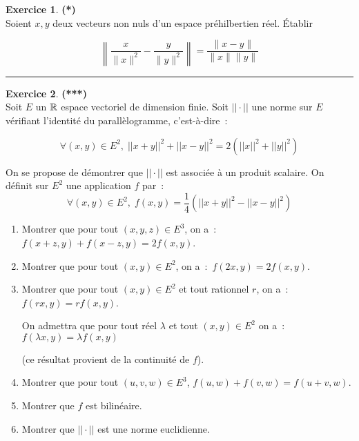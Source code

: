 \documentclass[a4paper,11pt]{article}
\theoremstyle{definition}
\newtheorem{exo}{Exercice} %
\begin{document}
\begin{minipage}{1\linewidth}
\begin{minipage}[t]{0.48\linewidth}
\begin{exo}\textbf{(*)}\quad\\[0.2cm]	
Soient $x, y$ deux vecteurs non nuls d'un espace préhilbertien réel. Établir

$$
\left\|\frac{x}{\|x\|^{2}}-\frac{y}{\|y\|^{2}}\right\|=\frac{\|x-y\|}{\|x\|\|y\|}
$$

\centering\rule{1\linewidth}{0.6pt}\end{exo}





\end{minipage}\end{minipage} \newpage


\begin{minipage}{1\linewidth}\begin{minipage}[t]{0.48\linewidth}\raggedright
		\begin{exo}\textbf{(***)}\quad\\[0.2cm]
			Soit $E$ un $\mathbb{R}$ espace vectoriel de dimension finie. Soit $||\cdot||$ une norme sur $E$ vérifiant l'identité du parallèlogramme, c'est-à-dire~:~
			
			$$\forall(x,y)\in E^2,\;||x+y||^2+||x-y||^2=2(||x||^2+||y||^2)$$ 
			
			On se propose de démontrer que $||\cdot||$ est associée à un produit scalaire.
			On définit sur $E^2$ une application $f$ par~:~
			$$\forall(x,y)\in E^2,\;f(x,y)=\frac{1}{4}(||x+y||^2-||x-y||^2)$$
			\begin{enumerate}
				\item  Montrer que pour tout $(x,y,z) \in E^3$, on a~:~$f(x+z,y)+f(x-z,y)=2f(x,y)$.
				\item  Montrer que pour tout $(x,y) \in E^2$, on a~:~$f(2x,y)=2f(x,y)$.
				\item  Montrer que pour tout $(x,y) \in E^2$ et tout rationnel $r$, on a~:~$f(rx,y)=rf(x,y)$.
				
				On admettra que pour tout réel $\lambda$ et tout $(x,y) \in E^2$ on a~:~$f(\lambda x,y)=\lambda f(x,y)$
				
				(ce résultat provient de la continuité de $f$).
				\item  Montrer que pour tout $(u,v,w) \in E^3$, $f(u,w)+f(v,w)=f(u+v,w)$.
				\item  Montrer que $f$ est bilinéaire.
				\item  Montrer que $||\cdot||$ est une norme euclidienne.
			\end{enumerate}
			

\end{exo}
\end{minipage}
\end{minipage}
\end{document}
